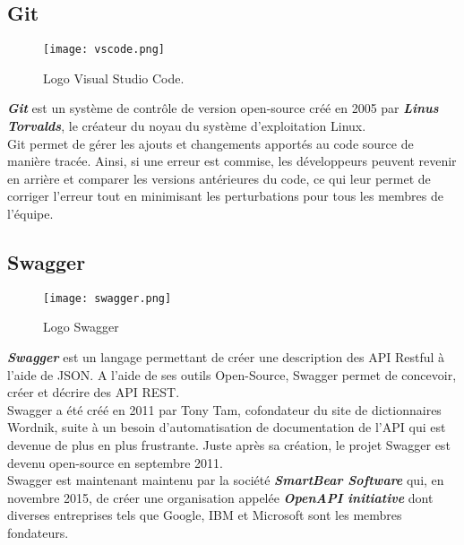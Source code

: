 \subsection{Git}
\vspace{1cm}
\begin{figure}[H]
    \centering
    \texttt{[image: vscode.png]}
    \vspace{1cm}
    \captionsetup{justification=centering}

    \caption{Logo Visual Studio Code.}
    \label{fig:vscode_logo}
\end{figure}
\textit{\textbf{Git}} \cite{git} est un système de contrôle de version open-source créé en 2005 par \textit{\textbf{Linus Torvalds}}, le créateur du noyau du système d'exploitation Linux.\\
\noindent Git permet de gérer les ajouts et changements apportés au code source de manière tracée. Ainsi, si une erreur est commise, les développeurs peuvent revenir en arrière et comparer les versions antérieures du code, ce qui leur permet de corriger l'erreur tout en minimisant les perturbations pour tous les membres de l'équipe.
\subsection{Swagger}
\vspace{1cm}
\begin{figure}[H]
    \centering
    \texttt{[image: swagger.png]}
    \vspace{1cm}
    \captionsetup{justification=centering}

    \caption{Logo Swagger}
    \label{fig:swagger_logo}
\end{figure}
\textit{\textbf{Swagger}} \cite{swagger} est un langage permettant de créer une description des API Restful à l'aide de JSON. A l'aide de ses outils Open-Source, Swagger permet de concevoir, créer et décrire des API REST.\\
\noindent Swagger a été créé en 2011 par Tony Tam, cofondateur du site de dictionnaires Wordnik, suite à un besoin d'automatisation de documentation de l'API qui est devenue de plus en plus frustrante. Juste après sa création, le projet Swagger est devenu open-source en septembre 2011.\\
\noindent Swagger est maintenant maintenu par la société \textit{\textbf{SmartBear Software}} qui, en novembre 2015, de créer une organisation appelée \textit{\textbf{OpenAPI initiative}} dont diverses entreprises tels que Google, IBM et Microsoft sont les membres fondateurs.\\
